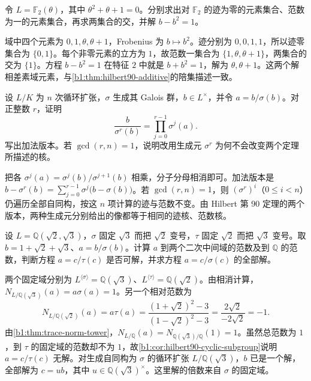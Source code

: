 \begin{exercise}\label{b1:ex:20-3}
	令 \(L=\mathbb F_2(\theta)\)，其中 \(\theta^2+\theta+1=0\)。分别求出对 \(\mathbb F_2\) 的迹为零的元素集合、范数为一的元素集合，再求两集合的交，并解 \(b-b^2=1\)。
\end{exercise}
\begin{solution}
	域中四个元素为 \(0,1,\theta,\theta+1\)，Frobenius 为 \(b\mapsto b^2\)。迹分别为 \(0,0,1,1\)，所以迹零集合为 \(\{0,1\}\)。每个非零元素的立方为 \(1\)，故范数一集合为 \(\{1,\theta,\theta+1\}\)，两集合的交为 \(\{1\}\)。方程 \(b-b^2=1\) 在特征 \(2\) 中就是 \(b+b^2=1\)，解为 \(\theta,\theta+1\)。这两个解相差素域元素，与\cref{b1:thm:hilbert90-additive}的陪集描述一致。
\end{solution}

\begin{exercise}\label{b1:ex:20-4}
	设 \(L/K\) 为 \(n\) 次循环扩张，\(\sigma\) 生成其 Galois 群，\(b\in L^\times\)，并令 \(a=b/\sigma(b)\)。对正整数 \(r\)，证明
	\[
		\frac b{\sigma^r(b)}=\prod_{j=0}^{r-1}\sigma^j(a).
	\]
	写出加法版本。若 \(\gcd(r,n)=1\)，说明改用生成元 \(\sigma^r\) 为何不会改变两个定理所描述的核。
\end{exercise}
\begin{solution}
	把各 \(\sigma^j(a)=\sigma^j(b)/\sigma^{j+1}(b)\) 相乘，分子分母相消即可。加法版本是 \(b-\sigma^r(b)=\sum_{j=0}^{r-1}\sigma^j\bigl(b-\sigma(b)\bigr)\)。若 \(\gcd(r,n)=1\)，则 \((\sigma^r)^i\)（\(0\leq i<n\)）仍遍历全部自同构，按这 \(n\) 项计算的迹与范数不变。由 Hilbert 第 90 定理的两个版本，两种生成元分别给出的像都等于相同的迹核、范数核。
\end{solution}

\begin{exercise}\label{b1:ex:20-5}
	设 \(L=\mathbb Q(\sqrt2,\sqrt3)\)，\(\sigma\) 固定 \(\sqrt3\) 而把 \(\sqrt2\) 变号，\(\tau\) 固定 \(\sqrt2\) 而把 \(\sqrt3\) 变号。取 \(b=1+\sqrt2+\sqrt3\)、\(a=b/\sigma(b)\)。计算 \(a\) 到两个二次中间域的范数及到 \(\mathbb Q\) 的范数，判断方程 \(a=c/\tau(c)\) 是否可解，并求方程 \(a=c/\sigma(c)\) 的全部解。
\end{exercise}
\begin{solution}
	两个固定域分别为 \(L^{\langle\sigma\rangle}=\mathbb Q(\sqrt3)\)、\(L^{\langle\tau\rangle}=\mathbb Q(\sqrt2)\)。由相消计算，\(N_{L/\mathbb Q(\sqrt3)}(a)=a\sigma(a)=1\)。另一个相对范数为
	\[
		N_{L/\mathbb Q(\sqrt2)}(a)=a\tau(a) =\frac{(1+\sqrt2)^2-3}{(1-\sqrt2)^2-3} =\frac{2\sqrt2}{-2\sqrt2}=-1.
	\]
	由\cref{b1:thm:trace-norm-tower}，\(N_{L/\mathbb Q}(a)=N_{\mathbb Q(\sqrt3)/\mathbb Q}(1)=1\)。虽然总范数为 \(1\)，到 \(\tau\) 的固定域的范数却不为 \(1\)，故\cref{b1:cor:hilbert90-cyclic-subgroup}说明 \(a=c/\tau(c)\) 无解。对生成自同构为 \(\sigma\) 的循环扩张 \(L/\mathbb Q(\sqrt3)\)，\(b\) 已是一个解，全部解为 \(c=ub\)，其中 \(u\in\mathbb Q(\sqrt3)^\times\)。这里解的倍数来自 \(\sigma\) 的固定域。
\end{solution}


